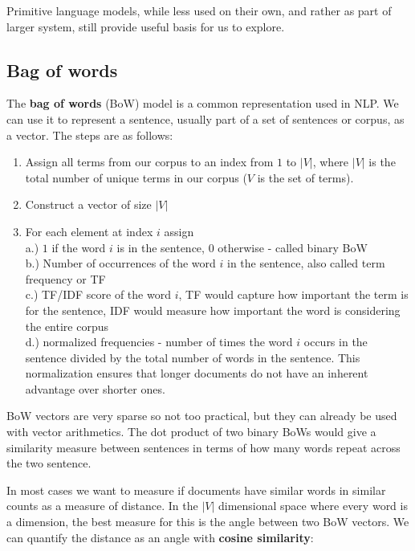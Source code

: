 Primitive language models, while less used on their own, and rather as part of larger system, still provide useful basis for us to explore.

\subsection{Bag of words}

The \textbf{bag of words} (BoW) model is a common representation used in NLP. We can use it to represent a sentence, usually part of a set of sentences or corpus, as a vector. The steps are as follows:

\begin{enumerate}
    \item Assign all terms from our corpus to an index from \(1\) to \(|V|\), where \(|V|\) is the total number of unique terms in our corpus (\(V\) is the set of terms).
    \item Construct a vector of size \(|V|\)
    \item For each element at index \(i\) assign\\
a.) \(1\) if the word \(i\) is in the sentence, \(0\) otherwise - called binary BoW\\
b.) Number of occurrences of the word \(i\) in the sentence, also called term frequency or TF\\
c.) TF/IDF score of the word \(i\), TF would capture how important the term is for the sentence, IDF would measure how important the word is considering the entire corpus\\
d.) normalized frequencies - number of times the word \(i\) occurs in the sentence divided by the total number of words in the sentence. This normalization ensures that longer documents do not have an inherent advantage over shorter ones.
\end{enumerate}

BoW vectors are very sparse so not too practical, but they can already be used with vector arithmetics. The dot product of two binary BoWs would give a similarity measure between sentences in terms of how many words repeat across the two sentence.

In most cases we want to measure if documents have similar words in similar counts as a measure of distance. In the \(|V|\) dimensional space where every word is a dimension, the best measure for this is the angle between two BoW vectors. We can quantify the distance as an angle with \textbf{cosine similarity}:

